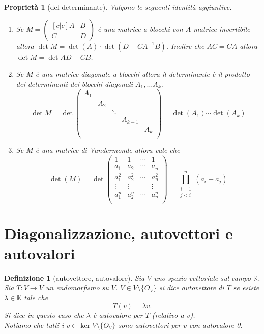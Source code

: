 \documentclass[9pt, a4paper]{article}
\newcommand{\K}{\mathbb{K}}
\newcommand{\letvs}{Sia $ V $ uno spazio vettoriale sul campo $ \K $}
\theoremstyle{mythm}
\newtheorem{definition}{Definizione}[section]
\newtheorem{propriety}{Proprietà}[section]
\begin{document}
\begin{propriety}[del determinante]
	Valgono le seguenti identità aggiuntive. 
	\begin{enumerate}
		\item Se $ M = \begin{pmatrix}[c|c]
		A & B \\ \hline
		C & D
		\end{pmatrix} $	
		è una matrice a blocchi con $ A $ matrice invertibile allora $ \det{M} = \det{(A)} \cdot \det{(D - CA^{-1}B)} $. Inoltre che $ AC = CA $ allora $ \det{M} = \det{AD - CB} $. 
		\item Se $ M $ è una matrice diagonale a blocchi allora il determinante è il prodotto dei determinanti dei blocchi diagonali $ A_1, \ldots A_k $. 
		\[\det{M} = \det
		\begin{pmatrix}
		A_1		&		&		&		&		 \\
				& A_2	&		&		&		 \\
				& 		&\ddots &		&		 \\	 
				& 		&		& A_{k - 1}		&		 \\	
				& 		& &		& A_{k}		 \\	 		 		
		\end{pmatrix}
		= \det{(A_1)} \cdots \det{(A_k)}\]
		\item Se $ M $ è una \emph{matrice di Vandermonde} allora vale che 
		\[\det{(M)} = \det 
		\begin{pmatrix}
			1 & 1 & \cdots & 1 \\
			a_1 & a_2 & \cdots & a_n \\
			a_1^{2} & a_2^{2} & \cdots & a_n^{2} \\
			\vdots & \vdots & & \vdots \\
			a_1^{n} & a_2^{n} & \cdots & a_n^{n} \\
		\end{pmatrix} 
		= \prod_{\substack{i = 1 \\ j < i}}^{n} (a_i - a_j)\]
	\end{enumerate}
\end{propriety}

\clearpage

\section{Diagonalizzazione, autovettori e autovalori}

\begin{definition}[autovettore, autovalore]
	\letvs. Sia $ T \colon V \to V $ un endomorfismo su $ V $. $ V \in V \setminus \{O_V\} $ si dice autovettore di $ T $ se esiste $ \lambda \in \K $ tale che \[T(v) = \lambda v.\] Si dice in questo caso che $ \lambda $ è autovalore per $ T $ (relativo a $ v $). \\
	Notiamo che tutti i $ v \in \ker V \setminus \{O_V\} $ sono autovettori per $ v $ con autovalore 0.  
\end{definition}
\end{document}
